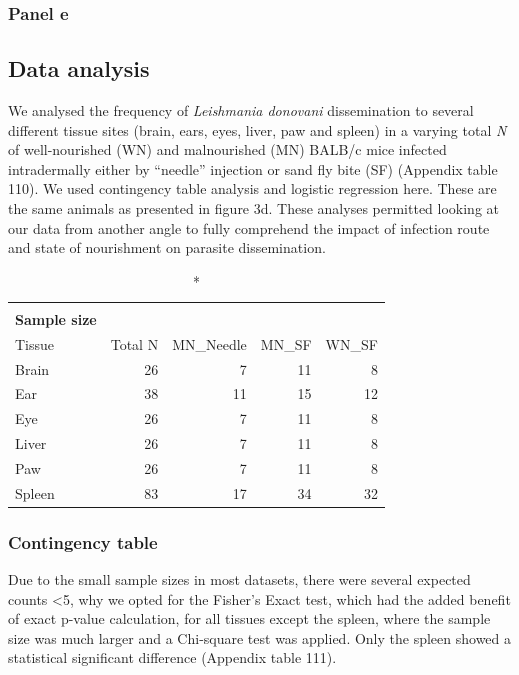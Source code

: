 \documentclass[
  12pt,
  letterpaper,
]{article}
\begin{document}
\subsubsection{Panel e}\label{panel-e-1}

\subsection{Data analysis}\label{data-analysis-6}

We analysed the frequency of \emph{Leishmania donovani} dissemination to several different tissue sites (brain, ears, eyes, liver, paw and spleen) in a varying total \emph{N} of well-nourished (WN) and malnourished (MN) BALB/c mice infected intradermally either by ``needle'' injection or sand fly bite (SF) (Appendix table 110). We used contingency table analysis and logistic regression here. These are the same animals as presented in figure 3d. These analyses permitted looking at our data from another angle to fully comprehend the impact of infection route and state of nourishment on parasite dissemination.

\begingroup
\fontsize{12.0pt}{14.4pt}\selectfont
\begin{longtable}{l|rrrr}
\caption*{
{\large \textbf{Appendix Table 110}} \\ 
{\small \textbf{Sample size}}
} \\ 
\toprule
Tissue & {Total N} & MN\_Needle & MN\_SF & WN\_SF \\ 
\midrule\addlinespace[2.5pt]
Brain & 26 & 7 & 11 & 8 \\ 
Ear & 38 & 11 & 15 & 12 \\ 
Eye & 26 & 7 & 11 & 8 \\ 
Liver & 26 & 7 & 11 & 8 \\ 
Paw & 26 & 7 & 11 & 8 \\ 
Spleen & 83 & 17 & 34 & 32 \\ 
\bottomrule
\end{longtable}
\endgroup

\subsubsection{Contingency table}\label{contingency-table-3}

Due to the small sample sizes in most datasets, there were several expected counts \textless5, why we opted for the Fisher's Exact test, which had the added benefit of exact p-value calculation, for all tissues except the spleen, where the sample size was much larger and a Chi-square test was applied. Only the spleen showed a statistical significant difference (Appendix table 111).
\end{document}
